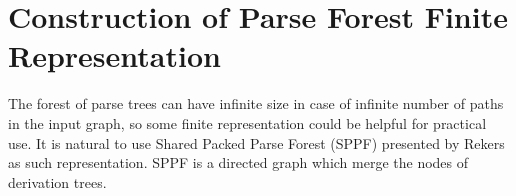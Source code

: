 \section{Construction of Parse Forest Finite Representation}
The forest of parse trees can have infinite size in case of infinite number of paths in 
the input graph, so some finite representation could be helpful for practical use. 
It is natural to use Shared Packed Parse Forest (SPPF) presented by Rekers~\cite{SPPF}
as such representation. SPPF is a directed graph which merge the nodes of 
derivation trees. 

